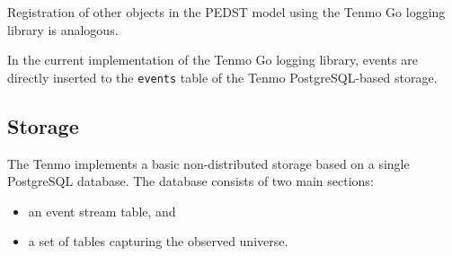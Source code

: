 Registration of other objects in the PEDST model using the Tenmo Go logging library is analogous.

In the current implementation of the Tenmo Go logging library, events are directly inserted to the \texttt{events} table of the Tenmo PostgreSQL-based storage.

\subsection{Storage}\label{sec:storage}

The Tenmo implements a basic non-distributed storage based on a single PostgreSQL database. The database consists of two main sections:
%
\begin{itemize}
	\item an event stream table, and
	\item a set of tables capturing the observed universe.
\end{itemize}

